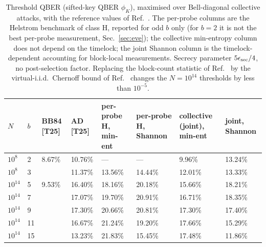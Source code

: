 \documentclass[aps,pra,twocolumn,superscriptaddress,nofootinbib]{revtex4-2}
\begin{document}
\begin{table}[t]\centering\caption{Threshold QBER (sifted-key QBER $\phi_K$), maximised over Bell-diagonal collective attacks, with the reference values of Ref.~\cite{T25}. The per-probe columns are the Helstrom benchmark of class H, reported for odd $b$ only (for $b=2$ it is not the best per-probe measurement, Sec.~\ref{sec:eve}); the collective min-entropy column does not depend on the timelock; the joint Shannon column is the timelock-dependent accounting for block-local measurements. Secrecy parameter $5\epsilon_{\rm sec}/4$, no post-selection factor. Replacing the block-count statistic of Ref.~\cite{T25} by the virtual-i.i.d.\ Chernoff bound of Ref.~\cite{Jiang21} changes the $N=10^{14}$ thresholds by less than $10^{-5}$.}\label{tab:thr}
\begin{tabular}{llllllll}\toprule
$N$ & $b$ & BB84 [T25] & AD [T25] & per-probe H, min-ent & per-probe H, Shannon & collective (joint), min-ent & joint, Shannon\\\midrule
$10^{8}$ & 2 & 8.67\% & 10.76\% & — & — & 9.96\% & 13.24\%\\
$10^{8}$ & 3 &  & 11.37\% & 13.56\% & 14.44\% & 12.01\% & 13.33\%\\
$10^{14}$ & 5 & 9.53\% & 16.40\% & 18.16\% & 20.18\% & 15.66\% & 18.21\%\\
$10^{14}$ & 7 &  & 17.07\% & 19.70\% & 20.91\% & 16.71\% & 18.35\%\\
$10^{14}$ & 9 &  & 17.30\% & 20.66\% & 20.81\% & 17.30\% & 17.40\%\\
$10^{14}$ & 11 &  & 16.67\% & 21.24\% & 19.20\% & 17.66\% & 15.29\%\\
$10^{14}$ & 15 &  & 13.23\% & 21.83\% & 15.45\% & 17.48\% & 11.86\%\\\bottomrule\end{tabular}\end{table}
\end{document}
